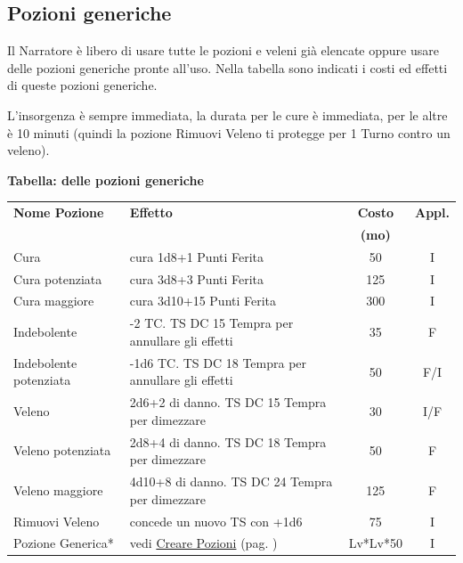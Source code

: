 \begin{multicols}{2}
\subsection{Pozioni generiche}

Il Narratore è libero di usare tutte le pozioni e veleni già elencate oppure usare delle pozioni generiche pronte all'uso. Nella tabella sono indicati i costi ed effetti di queste pozioni generiche.

L'insorgenza è sempre immediata, la durata per le cure è immediata, per le altre è 10 minuti (quindi la pozione Rimuovi Veleno ti protegge per 1 Turno contro un veleno).

\end{multicols}


%

\textbf{Tabella: delle pozioni generiche}\label{pozionigeneriche}\hypertarget{pozionigeneriche}{}

\medskip

\noindent\begin{tabularx}{\linewidth}{lXcc}
	\toprule
\rowcolor{gray!20}\textbf{Nome Pozione}& \textbf{Effetto}&\textbf{Costo}&\textbf{Appl.}\\
\rowcolor{gray!20}&&\textbf{(mo)}&\\
 \toprule
Cura& cura 1d8+1 Punti Ferita & 50 & I\\
\rowcolor{gray!20}Cura potenziata& cura 3d8+3 Punti Ferita & 125& I\\
Cura maggiore& cura 3d10+15 Punti Ferita & 300& I\\
\rowcolor{gray!20}Indebolente& -2 TC. TS DC 15 Tempra per annullare gli effetti& 35 & F\\
Indebolente potenziata& -1d6 TC. TS DC 18 Tempra per annullare gli effetti& 50 & F/I \\
\rowcolor{gray!20}Veleno&2d6+2 di danno. TS DC 15 Tempra per dimezzare& 30 & I/F \\
Veleno potenziata& 2d8+4 di danno. TS DC 18 Tempra per dimezzare & 50 & F \\
\rowcolor{gray!20}Veleno maggiore& 4d10+8 di danno. TS DC 24 Tempra per dimezzare& 125 & F \\
Rimuovi Veleno& concede un nuovo TS con +1d6 & 75 & I\\
\rowcolor{gray!20}Pozione Generica* & vedi \hyperlink{crearepozioni}{Creare Pozioni} (pag. \pageref{crearepozioni}) &Lv*Lv*50&I

\end{tabularx}

